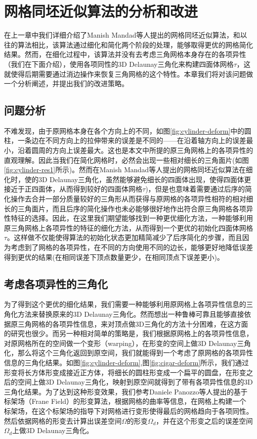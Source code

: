 \chapter{网格同坯近似算法的分析和改进}

在上一章中我们详细介绍了Manish Mandad等人提出的网格同坯近似算法\cite{isotopic-appro}，和以往的算法相比，该算法通过细化和简化两个阶段的处理，能够取得更优的网格简化结果。然而，在细化过程中，该算法并没有去考虑三角网格本身存在的各项异性（我们在下面介绍），使用各项同性的3D Delaunay三角化来构建四面体网格$\tau$，这就使得后期需要通过消边操作来恢复三角网格的这个特性。本章我们将对该问题做一个分析阐述，并提出我们的改进策略。

\section{问题分析}
不难发现，由于原网格本身在各个方向上的不同，如图\ref{fig:cylinder-deform}中的圆柱，一条边在不同方向上的拉伸带来的误差是不同的——在沿着轴方向上的误差最小，沿着圆周的方向上误差最大。这也是本文中所提的原三角网格上的各项异性的直观理解。因此当我们在简化网格时，必然会出现一些相对细长的三角面片(如图\ref{fig:cylinder-res1}所示)。然而在Manish Mandad等人提出的网格同坯近似算法在细化时，使的3D Delaunay三角化，虽然能够避免细长的四面体出现，使得四面体更接近于正四面体，从而得到较好的四面体网格$\tau$)，但是也意味着需要通过后序的简化操作去合并一部分质量较好的三角形从而获得与原网格的各项异性相符的相对细长的三角面片，而且后序的简化操作也未必能够很好地作出符合原三角网格各项异性特征的选择。因此，在这里我们期望能够找到一种更优细化方法，一种能够利用原三角网格上各项异性的特征的细化方法，从而得到一个更优的初始化四面体网格$\tau$。这样做不仅能使得算法的初始化状态更加精简减少了后序简化的步骤，而且因为考虑到了网格的各项异性，在不同的方向使用不同的边长，能够更好地降低误差得到更优的结果(在相同误差下顶点数量更少，在相同顶点下误差更小)。

\section{考虑各项异性的三角化}
为了得到这个更优的细化结果，我们需要一种能够利用原网格上各项异性信息的三角化方法来替换原来的3D Delaunay三角化。然而想出一种鲁棒可靠且能够直接依据原三角网格的各项异性信息，来对顶点做3D三角化的方法十分困难，在这方面的研究也很少。而另一种相对简单的策略是，我们根据原网格上的各项异性信息，对原网格所在的空间做一个变形（warping），在形变的空间上做3D Delaunay三角化，那么将这个三角化返回到原空间，我们就能得到一个考虑了原网格的各项异性信息的三角化结果。如图\ref{fig:cylinder-deform},图\ref{fig:cigar-deform}所示，我们通过形变将长方体形变成接近正方体，将细长的圆柱形变成一个扁平的圆盘，在形变之后的空间上做3D Delaunay三角化，映射到原空间就得到了带有各项异性信息的3D三角化结果。为了达到这种形变效果，我们参考Daniele Panozzo等人提出的基于标架场（Frane Field）的形变算法\cite{frame-field-warping}，根据网格的曲率等信息，在网格上构建一个标架场，在这个标架场的指导下对网格进行变形使得最后的网格趋向于各项同性。然后依据网格的形变去计算出误差空间$\Omega$的形变$\Omega_d$，并在这个形变之后的误差空间$\Omega_d$上做3D Delaunay三角化。

